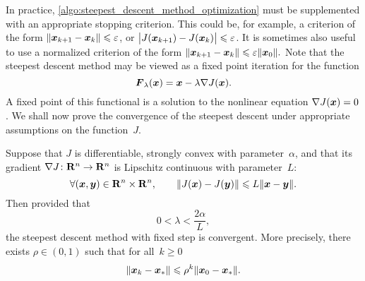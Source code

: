 In practice, \cref{algo:steepest_descent_method_optimization} must be supplemented with an appropriate stopping criterion.
This could be, for example, a criterion of the form $\lVert\mathbf{\boldsymbol{x}}_{k+1} - \mathbf{\boldsymbol{x}}_k\rVert \leqslant \varepsilon$,
or $\bigl\lvert J(\mathbf{\boldsymbol{x}}_{k+1}) - J(\mathbf{\boldsymbol{x}}_k) \bigr\rvert \leqslant \varepsilon$.
It is sometimes also useful to use a normalized criterion of the form $\lVert\mathbf{\boldsymbol{x}}_{k+1} - \mathbf{\boldsymbol{x}}_k\rVert \leqslant \varepsilon \lVert\mathbf{\boldsymbol{x}}_0\rVert.$
Note that the steepest descent method may be viewed as a fixed point iteration for the function
\begin{equation}
    \label{eq:fixed_point_gradient_descent}
    \mathbf{\boldsymbol{F}}_{\lambda}(\mathbf{\boldsymbol{x}}) = \mathbf{\boldsymbol{x}} - \lambda \nabla J(\mathbf{\boldsymbol{x}}).
\end{equation}
A fixed point of this functional is a solution to the nonlinear equation $\nabla J(\mathbf{\boldsymbol{x}}) = 0$.
We shall now prove the convergence of the steepest descent under appropriate assumptions on the function~$J$.
\begin{theorem}
    \label{theorem:convergence_steepest_descent_optimization}
    Suppose that $J$ is differentiable, strongly convex with parameter~$\alpha$,
    and that its gradient $\nabla J \colon \mathbf R^n \to \mathbf R^n$ is Lipschitz continuous with parameter~$L$:
    \[
        \forall (\mathbf{\boldsymbol{x}}, \mathbf{\boldsymbol{y}}) \in \mathbf R^n \times \mathbf R^n, \qquad
        \lVert J(\mathbf{\boldsymbol{x}}) - J(\mathbf{\boldsymbol{y}})\rVert \leqslant L \lVert\mathbf{\boldsymbol{x}} - \mathbf{\boldsymbol{y}}\rVert.
    \]
    Then provided that
    \begin{equation}
        \label{eq:condition_time_step}
        0 < \lambda < \frac{2 \alpha}{L},
    \end{equation}
    the steepest descent method with fixed step is convergent.
    More precisely,
    there exists $\rho \in (0, 1)$ such that for all~$k \geq 0$
    \begin{equation}
        \label{eq:exponential_convergence}
        \lVert\mathbf{\boldsymbol{x}}_k - \mathbf{\boldsymbol{x}}_*\rVert \leqslant \rho^k \lVert\mathbf{\boldsymbol{x}}_0 - \mathbf{\boldsymbol{x}}_*\rVert.
    \end{equation}
\end{theorem}
